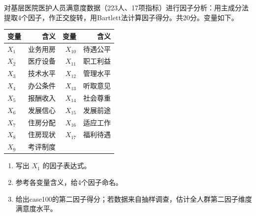 \par\addvspace{6pt}\noindent\begin{minipage}{\linewidth}


对基层医院医护人员满意度数据（223人、17项指标）进行因子分析：用主成分法提取4个因子，作正交旋转，用Bartlett法计算因子得分。共20分。变量如下。

\begin{center}\small\setlength{\tabcolsep}{4pt}\renewcommand{\arraystretch}{1.18}\begin{tabular}{@{}lrrr@{}}
\toprule
变量 & 含义 & 变量 & 含义 \\
\midrule

\(X_1\) & 业务用房 & \(X_10\) & 待遇公平 \\
\(X_2\) & 医疗设备 & \(X_11\) & 职工利益 \\
\(X_3\) & 技术水平 & \(X_12\) & 管理水平 \\
\(X_4\) & 办公条件 & \(X_13\) & 听取意见 \\
\(X_5\) & 报酬收入 & \(X_14\) & 社会尊重 \\
\(X_6\) & 发展信心 & \(X_15\) & 发展前途 \\
\(X_7\) & 住房分配 & \(X_16\) & 适应工作 \\
\(X_8\) & 住房现状 & \(X_17\) & 福利待遇 \\
\(X_9\) & 考评制度 & & \\
\bottomrule\end{tabular}\end{center}

\begin{enumerate}
\def\labelenumi{\arabic{enumi}.}
\tightlist
\item
  写出 \(X_1\) 的因子表达式。
\item
  参考各变量含义，给4个因子命名。
\item
  给出case100的第二因子得分；若数据来自抽样调查，估计全人群第二因子维度满意度水平。
\end{enumerate}



\end{minipage}\par\vspace{4pt}

